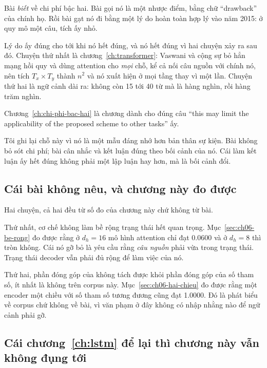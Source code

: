 Bài \emph{biết} về chi phí bậc hai. Bài gọi nó là một nhược điểm, bằng chữ
\enquote{drawback} của chính họ. Rồi bài gạt nó đi bằng một lý do hoàn toàn hợp
lý vào năm 2015: ở quy mô một câu, tích ấy nhỏ.

%
Lý do ấy đúng cho tới khi nó hết đúng, và nó hết đúng vì hai chuyện xảy ra sau
đó. Chuyện thứ nhất là chương~\ref{ch:transformer}: Vaswani và cộng sự bỏ hẳn
mạng hồi quy và dùng attention cho \emph{mọi} chỗ, kể cả nối câu nguồn với
chính nó, nên tích \(T_x \times T_y\) thành \(n^2\) và nó xuất hiện ở mọi tầng
thay vì một lần. Chuyện thứ hai là ngữ cảnh dài ra: không còn 15 tới 40 từ mà
là hàng nghìn, rồi hàng trăm nghìn.

Chương~\ref{ch:chi-phi-bac-hai} là chương dành cho đúng câu \enquote{this may
limit the applicability of the proposed scheme to other tasks} ấy.

Tôi ghi lại chỗ này vì nó là một mẫu đáng nhớ hơn bản thân sự kiện. Bài không
bỏ sót chi phí; bài cân nhắc và kết luận đúng theo bối cảnh của nó. Cái làm
kết luận ấy hết đúng không phải một lập luận hay hơn, mà là bối cảnh đổi.

\subsection*{Cái bài không nêu, và chương này đo được}

%
Hai chuyện, cả hai đều từ số đo của chương này chứ không từ bài.

Thứ nhất, cơ chế không làm bề rộng trạng thái hết quan trọng.
Mục~\ref{sec:ch06-be-rong} đo được rằng ở \(d_h = 16\) mô hình attention chỉ
đạt 0.0600 và ở \(d_h = 8\) thì tròn không. Cái nó gỡ bỏ là yêu cầu rằng
\emph{câu nguồn} phải vừa trong trạng thái. Trạng thái decoder vẫn phải đủ rộng
để làm việc của nó.

Thứ hai, phần đóng góp của  không
tách được khỏi phần đóng góp của số tham số, ít nhất là không trên corpus này.
Mục~\ref{sec:ch06-hai-chieu} đo được rằng một encoder một chiều với số tham số
tương đương cũng đạt 1.0000. Đó là phát biểu về corpus chứ không về bài, vì văn
phạm ở đây không có nhập nhằng nào để ngữ cảnh phải gỡ.

\subsection*{Cái chương~\ref{ch:lstm} để lại thì chương này vẫn không đụng tới}

